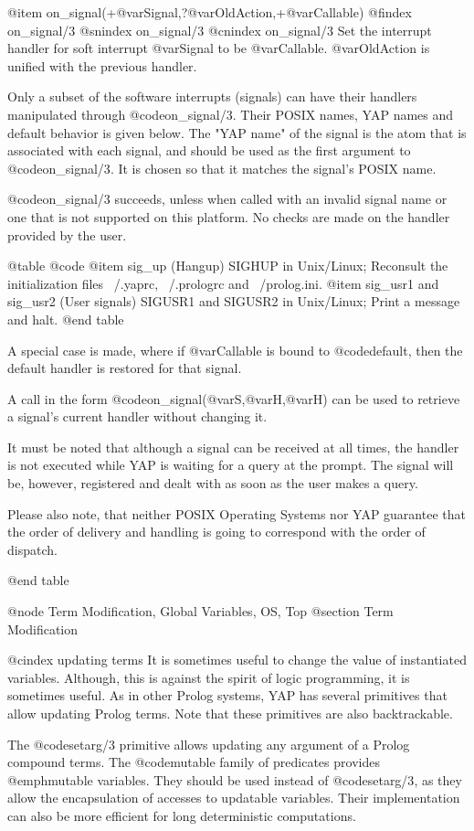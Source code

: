 {{{{{{@item on_signal(+@var{Signal},?@var{OldAction},+@var{Callable})
@findex on_signal/3
@snindex on_signal/3
@cnindex on_signal/3
Set the interrupt handler for soft interrupt @var{Signal} to be
@var{Callable}. @var{OldAction} is unified with the previous handler.

Only a subset of the software interrupts (signals) can have their
handlers manipulated through @code{on_signal/3}.
Their POSIX names, YAP names and default behavior is given below.
The "YAP name" of the signal is the atom that is associated with
each signal, and should be used as the first argument to
@code{on_signal/3}. It is chosen so that it matches the signal's POSIX
name.

@code{on_signal/3} succeeds, unless when called with an invalid
signal name or one that is not supported on this platform. No checks
are made on the handler provided by the user.

@table @code
@item sig_up (Hangup)
  SIGHUP in Unix/Linux; Reconsult the initialization files
  ~/.yaprc, ~/.prologrc and ~/prolog.ini.
@item sig_usr1 and sig_usr2 (User signals)
  SIGUSR1 and SIGUSR2 in Unix/Linux; Print a message and halt.
@end table

A special case is made, where if @var{Callable} is bound to
@code{default}, then the default handler is restored for that signal.

A call in the form @code{on_signal(@var{S},@var{H},@var{H})} can be used
to retrieve a signal's current handler without changing it.

It must be noted that although a signal can be received at all times,
the handler is not executed while YAP is waiting for a query at the
prompt. The signal will be, however, registered and dealt with as soon
as the user makes a query.

Please also note, that neither POSIX Operating Systems nor YAP guarantee
that the order of delivery and handling is going to correspond with the
order of dispatch.

@end table

@node Term Modification, Global Variables, OS, Top
@section Term Modification

@cindex updating terms
It is sometimes useful to change the value of instantiated
variables. Although, this is against the spirit of logic programming, it
is sometimes useful. As in other Prolog systems, YAP has
several primitives that allow updating Prolog terms. Note that these
primitives are also backtrackable.

The @code{setarg/3} primitive allows updating any argument of a Prolog
compound terms. The @code{mutable} family of predicates provides
@emph{mutable variables}. They should be used instead of @code{setarg/3},
as they allow the encapsulation of accesses to updatable
variables. Their implementation can also be more efficient for long
deterministic computations.

}}}}}}
